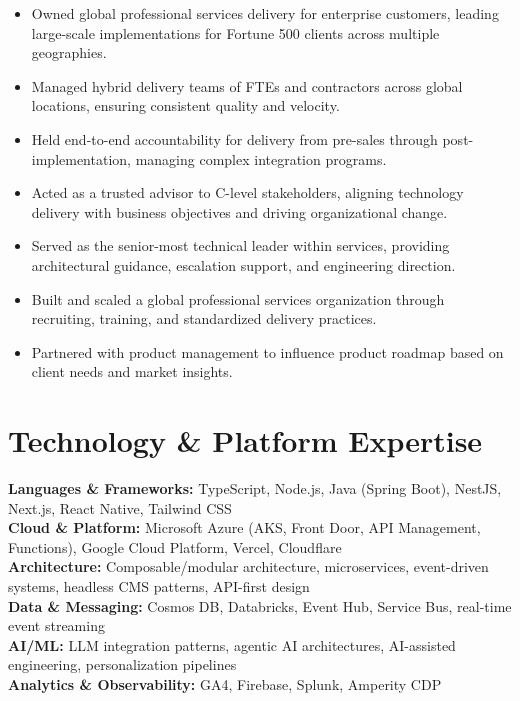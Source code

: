 \documentclass[11pt]{article}
\begin{document}
\begin{itemize}
  \item Owned global professional services delivery for enterprise customers, leading large-scale implementations for Fortune 500 clients across multiple geographies.
  \item Managed hybrid delivery teams of FTEs and contractors across global locations, ensuring consistent quality and velocity.
  \item Held end-to-end accountability for delivery from pre-sales through post-implementation, managing complex integration programs.
  \item Acted as a trusted advisor to C-level stakeholders, aligning technology delivery with business objectives and driving organizational change.
  \item Served as the senior-most technical leader within services, providing architectural guidance, escalation support, and engineering direction.
  \item Built and scaled a global professional services organization through recruiting, training, and standardized delivery practices.
  \item Partnered with product management to influence product roadmap based on client needs and market insights.
\end{itemize}

\section*{Technology \& Platform Expertise}
\textbf{Languages \& Frameworks:} TypeScript, Node.js, Java (Spring Boot), NestJS, Next.js, React Native, Tailwind CSS \\
\textbf{Cloud \& Platform:} Microsoft Azure (AKS, Front Door, API Management, Functions), Google Cloud Platform, Vercel, Cloudflare \\
\textbf{Architecture:} Composable/modular architecture, microservices, event-driven systems, headless CMS patterns, API-first design \\
\textbf{Data \& Messaging:} Cosmos DB, Databricks, Event Hub, Service Bus, real-time event streaming \\
\textbf{AI/ML:} LLM integration patterns, agentic AI architectures, AI-assisted engineering, personalization pipelines \\
\textbf{Analytics \& Observability:} GA4, Firebase, Splunk, Amperity CDP
\end{document}
